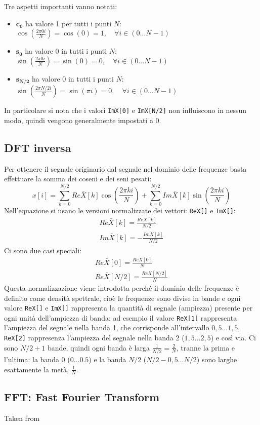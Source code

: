 Tre aspetti importanti vanno notati:
\begin{itemize}
	\item $\boldsymbol{c_0}$ ha valore 1 per tutti i punti $N$:
		$\cos\left(\frac{2\pi 0i}{N}\right) = \cos(0) = 1, \quad \forall i \in
		(0 \dots N-1)$
	\item $\boldsymbol{s_0}$ ha valore 0 in tutti i punti $N$:
		$\sin\left(\frac{2\pi 0i}{N}\right) = \sin(0) = 0, \quad \forall i \in
		(0 \dots N-1)$
	\item $\boldsymbol{s_{N/2}}$ ha valore 0 in tutti i punti $N$:
		$\sin\left(\frac{2\pi N/2i}{N}\right) = \sin(\pi i) = 0, \quad \forall i \in
		(0 \dots N-1)$
\end{itemize}

In particolare si nota che i valori \texttt{ImX[0]} e \texttt{ImX[N/2]} non
influiscono in nessun modo, quindi vengono generalmente impostati a 0. 

\subsection{DFT inversa}
Per ottenere il segnale originario dal segnale nel dominio delle frequenze basta
effettuare la somma dei coseni e dei seni pesati:
\[
x[i] = \sum_{k=0}^{N/2} Re\bar{X}[k] \cos\left(\frac{2\pi ki}{N}\right) +
\sum_{k=0}^{N/2} Im\bar{X}[k] \sin\left(\frac{2\pi ki}{N}\right)
\]
Nell'equazione si usano le versioni normalizzate dei vettori:
\texttt{ReX[]} e \texttt{ImX[]}:
\[
\begin{array}{l}
	Re\bar{X}[k] = \frac{ReX[k]}{N/2}\\[0.5em]
	Im\bar{X}[k] = -\frac{ImX[k]}{N/2}
\end{array}
\]
Ci sono due casi speciali:
\[
\begin{array}{l}
	Re\bar{X}[0] = \frac{ReX[0]}{N} \\[0.5em]
	Re\bar{X}[N/2] = \frac{ReX[N/2]}{N}
\end{array}
\]
Questa normalizzazione viene introdotta perch\'e il dominio delle frequenze \`e
definito come densit\`a spettrale, cio\`e le frequenze sono divise in bande e
ogni valore \texttt{ReX[]} e \texttt{ImX[]} rappresenta la quantit\`a di segnale
(ampiezza) presente per ogni unit\`a dell'ampiezza di banda: ad esempio il
valore \texttt{ReX[1]} rappresenta l'ampiezza del segnale nella banda 1, che
corrisponde all'intervallo $0,5\dots1,5$, \texttt{ReX[2]} rappresenza l'ampiezza
del segnale nella banda 2 ($1,5\dots2,5$) e cos\`i via. Ci sono $N/2+1$ bande,
quindi ogni banda \`e larga $\frac{1}{N/2} = \frac{2}{N}$, tranne la prima e
l'ultima: la banda 0 ($0\dots 0.5$) e la banda $N/2$ ($N/2-0,5\dots N/2$) sono
larghe esattamente la met\`a, $\frac{1}{N}$.

\subsection{FFT: Fast Fourier Transform}
\label{fft}
Taken from \cite{bertoni}

